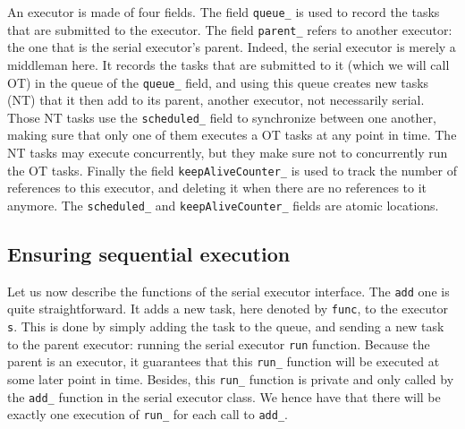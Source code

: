 An executor is made of four fields. The field \texttt{queue\_} is used to record the tasks that are submitted to the executor. The field \texttt{parent\_} refers to another executor: the one that is the serial executor's parent. Indeed, the serial executor is merely a middleman here. It records the tasks that are submitted to it (which we will call OT) in the queue of the \texttt{queue\_} field, and using this queue creates new tasks (NT) that it then add to its parent, another executor, not necessarily serial. Those NT tasks use the \texttt{scheduled\_} field to synchronize between one another, making sure that only one of them executes a OT tasks at any point in time. The NT tasks may execute concurrently, but they make sure not to concurrently run the OT tasks.
Finally the field \texttt{keepAliveCounter\_} is used to track the number of references to this executor, and deleting it when there are no references to it anymore. The \texttt{scheduled\_} and \texttt{keepAliveCounter\_} fields are atomic locations.

\subsection{Ensuring sequential execution}
Let us now describe the functions of the serial executor interface. The \texttt{add} one is quite straightforward. It adds a new task, here denoted by \texttt{func}, to the executor \texttt{s}. This is done by simply adding the task to the queue, and sending a new task to the parent executor: running the serial executor \texttt{run} function. Because the parent is an executor, it guarantees that this \texttt{run\_} function will be executed at some later point in time. Besides, this \texttt{run\_} function is private and only called by the \texttt{add\_} function in the serial executor class. We hence have that there will be exactly one execution of \texttt{run\_} for each call to \texttt{add\_}. 


